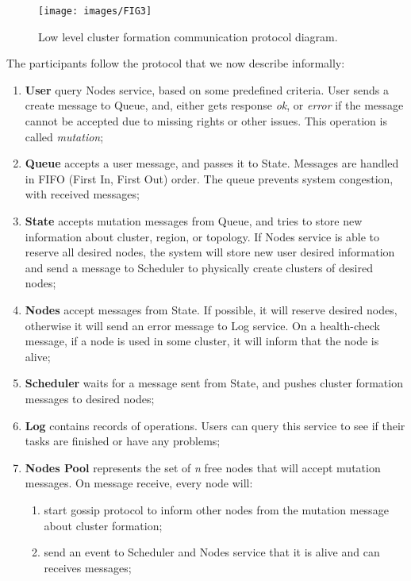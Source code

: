 \begin{figure}[H]
	\begin{center}
		\texttt{[image: images/FIG3]}
	\end{center}
	\vspace{-0.7cm}
	\caption{Low level cluster formation communication protocol diagram.}
	\label{fig:fig7}
\end{figure}

The participants follow the protocol that we now describe informally:

\begin{enumerate}[start=1,label={(\bfseries \arabic*)}]
	\item \label{cluster_formation_informal_description} \textbf{User} query Nodes service, based on some predefined criteria. User sends a create message to Queue, and, either gets response \textit{ok}, or \textit{error} if the message cannot be accepted due to missing rights or other issues. This operation is called \emph{mutation}; 
	\item \textbf{Queue} accepts a user message, and passes it to State. Messages are handled in FIFO (First In, First Out) order. The queue prevents system congestion, with received messages;
	\item \textbf{State} accepts mutation messages from Queue, and tries to store new information about cluster, region, or topology. If Nodes service is able to reserve all desired nodes, the system  will store new user desired information and send a message to Scheduler to physically create clusters of desired nodes;
	\item \textbf{Nodes} accept messages from State. If possible, it will reserve desired nodes, otherwise it will send an error message to Log service. On a health-check message, if a node is used in some cluster, it will inform that the node is alive;
	\item \textbf{Scheduler} waits for a message sent from State, and pushes cluster formation messages to desired nodes;
	\item \textbf{Log} contains records of operations. Users can query this service to see if their tasks are finished or have any problems;
	\item \textbf{Nodes Pool} represents the set of \emph{n} free nodes that will accept mutation messages. 
	On message receive, every node will:
	\begin{enumerate}[start=1,label={(\bfseries \roman*)}] 
		\item start gossip protocol to inform other nodes from the mutation message about cluster formation;
		\item send an event to Scheduler and Nodes service that it is alive and can receives messages;
	\end{enumerate}
\end{enumerate}

